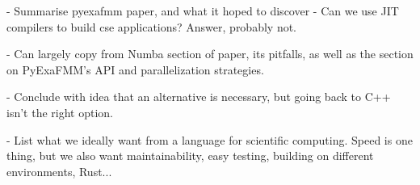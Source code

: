- Summarise pyexafmm paper, and what it hoped to discover - Can we use JIT compilers to build cse applications? Answer, probably not.

- Can largely copy from Numba section of paper, its pitfalls, as well as the section on PyExaFMM's API and parallelization strategies.

- Conclude with idea that an alternative is necessary, but going back to C++ isn't the right option.

- List what we ideally want from a language for scientific computing. Speed is one thing, but we also want maintainability, easy testing, building on different environments, Rust...

